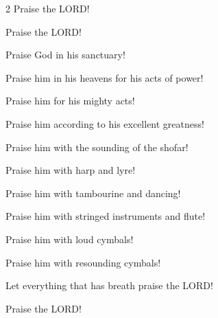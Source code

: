 \begin{multicols}{2}
	Praise the LORD!
	
	
	
	\mychapter{}\myverse*{}Praise the LORD!
	
	\quad\quad\quad Praise God in his sanctuary!
	
	Praise him in his heavens for his acts of power!
	
	
	\myverse{}Praise him for his mighty acts!
	
	Praise him according to his excellent greatness!
	
	
	\myverse{}Praise him with the sounding of the shofar!
	
	Praise him with harp and lyre!
	
	
	\myverse{}Praise him with tambourine and dancing!
	
	Praise him with stringed instruments and flute!
	
	
	\myverse{}Praise him with loud cymbals!
	
	Praise him with resounding cymbals!
	
	
	\myverse{}Let everything that has breath praise the LORD!
	
	Praise the LORD!
	
	
\end{multicols}

